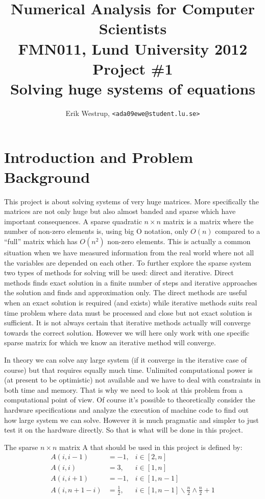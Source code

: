 \documentclass[10pt, a4paper]{article}
\title{Numerical Analysis for Computer Scientists\\ FMN011, Lund University 2012\\ Project \#1\\ Solving huge systems of equations}
\date{}
\author{Erik Westrup, \texttt{<ada09ewe@student.lu.se>}}
\begin{document}
\begin{titlepage}
\maketitle

\thispagestyle{empty}
\end{titlepage}
\setcounter{page}{2}

\section{Introduction and Problem Background}
This project is about solving systems of very huge matrices. More specifically the matrices are not only huge but also almost banded and sparse which have important consequences. A sparse quadratic $n\times n$  matrix is a matrix where the number of non-zero elements is, using big O notation, only $O(n)$ compared to a ``full'' matrix which has $O(n^2)$ non-zero elements. This is actually a common situation when we have measured information from the real world where not all the variables are depended on each other. To further explore the sparse system two types of methods for solving will be used: direct and iterative. Direct methods finds exact solution in a finite number of steps and iterative approaches the solution and finds and approximation only. The direct methods are useful when an exact solution is required (and exists) while iterative methods suits real time problem where data must be processed and close but not exact solution is sufficient. It is not always certain that iterative methods actually will converge towards the correct solution. However we will here only work with one specific sparse matrix for which we know an iterative method will converge.

In theory we can solve any large system (if it converge in the iterative case of course) but that requires equally much time. Unlimited computational power is (at present to be optimistic) not available and we have to deal with constraints in both time and memory. That is why we need to look at this problem from a computational point of view. Of course it's possible to theoretically consider the hardware specifications and analyze the execution of machine code to find out how large system we can solve. However it is much pragmatic and simpler to just test it on the hardware directly. So that is what will be done in this project. %

The sparse $n \times n$ matrix A that should be used in this project is defined by:
\begin{eqnarray} \label{matrix+a}
		A(i,i-1)   & =	-1, & i\in[2,n] \nonumber \\
		A(i,i)	   & =	3, & i\in[1,n] \nonumber \\
		A(i,i+1)   & =	-1, & i\in[1,n-1] \nonumber \\
		A(i,n+1-i) & =	\frac{1}{2}, & i\in[1,n-1]\backslash \frac{n}{2}\wedge\frac{n}{2}+1
\end{eqnarray}
\end{document}
